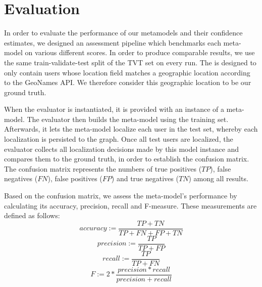\documentclass[10pt,a4paper]{article}
\begin{document}
\section{Evaluation}
In order to evaluate the performance of our metamodels and their confidence estimates, we designed an assessment pipeline which benchmarks each meta-model on various different scores. In order to produce comparable results, we use the same train-validate-test split of the TVT set on every run. The is designed to only contain users whose location field matches a geographic location according to the GeoNames API. We therefore consider this geographic location to be our ground truth.

When the evaluator is instantiated, it is provided with an instance of a meta-model. The evaluator then builds the meta-model using the training set. Afterwards, it lets the meta-model localize each user in the test set, whereby each localization is persisted to the graph. Once all test users are localized, the evaluator collects all localization decisions made by this model instance and compares them to the ground truth, in order to establish the confusion matrix. The confusion matrix represents the numbers of true positives ($TP$), false negatives ($FN$), false positives ($FP$) and true negatives ($TN$) among all results.

Based on the confusion matrix, we assess the meta-model's performance by calculating its accuracy, precision, recall and F-measure. These measurements are defined as follows:
\begin{equation}
accuracy := \frac{TP+TN}{TP+FN+FP+TN}
\end{equation}
\begin{equation}
precision := \frac{TP}{TP+FP}
\end{equation}
\begin{equation}
recall := \frac{TP}{TP+FN}
\end{equation}
\begin{equation}
F := 2*\frac{precision * recall}{precision + recall}
\end{equation}
\end{document}
